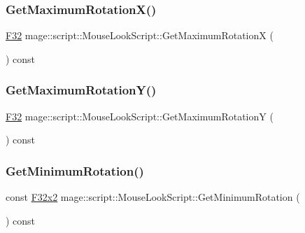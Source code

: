 \subsubsection{\texorpdfstring{Get\+Maximum\+Rotation\+X()}{GetMaximumRotationX()}}
{\footnotesize\ttfamily \hyperlink{namespacemage_aa97e833b45f06d60a0a9c4fc22ae02c0}{F32} mage\+::script\+::\+Mouse\+Look\+Script\+::\+Get\+Maximum\+RotationX (\begin{DoxyParamCaption}{ }\end{DoxyParamCaption}) const\hspace{0.3cm}{\ttfamily [noexcept]}}

\hypertarget{classmage_1_1script_1_1_mouse_look_script_a24f48ac9e66f9c14645db71fd55ab9c6}{}\label{classmage_1_1script_1_1_mouse_look_script_a24f48ac9e66f9c14645db71fd55ab9c6} 
\subsubsection{\texorpdfstring{Get\+Maximum\+Rotation\+Y()}{GetMaximumRotationY()}}
{\footnotesize\ttfamily \hyperlink{namespacemage_aa97e833b45f06d60a0a9c4fc22ae02c0}{F32} mage\+::script\+::\+Mouse\+Look\+Script\+::\+Get\+Maximum\+RotationY (\begin{DoxyParamCaption}{ }\end{DoxyParamCaption}) const\hspace{0.3cm}{\ttfamily [noexcept]}}

\hypertarget{classmage_1_1script_1_1_mouse_look_script_a09e7e193cf2f5dca3342a130268a7a67}{}\label{classmage_1_1script_1_1_mouse_look_script_a09e7e193cf2f5dca3342a130268a7a67} 
\subsubsection{\texorpdfstring{Get\+Minimum\+Rotation()}{GetMinimumRotation()}}
{\footnotesize\ttfamily const \hyperlink{namespacemage_aa87237ad091f5cd7da612b8523fc108f}{F32x2} mage\+::script\+::\+Mouse\+Look\+Script\+::\+Get\+Minimum\+Rotation (\begin{DoxyParamCaption}{ }\end{DoxyParamCaption}) const\hspace{0.3cm}{\ttfamily [noexcept]}}

